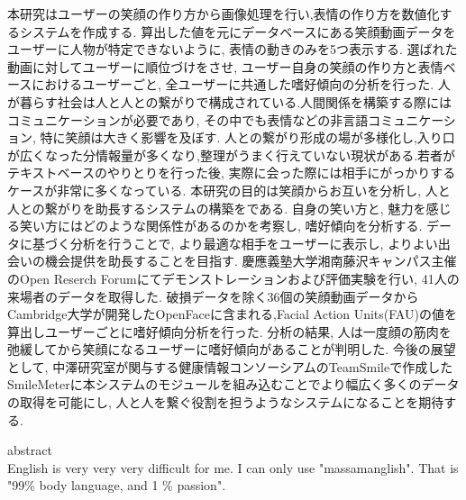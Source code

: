 


\begin{jabstract}
本研究はユーザーの笑顔の作り方から画像処理を行い,表情の作り方を数値化するシステムを作成する.
算出した値を元にデータベースにある笑顔動画データをユーザーに人物が特定できないように, 表情の動きのみを5つ表示する.
選ばれた動画に対してユーザーに順位づけをさせ, ユーザー自身の笑顔の作り方と表情ベースにおけるユーザーごと,
全ユーザーに共通した嗜好傾向の分析を行った.
人が暮らす社会は人と人との繋がりで構成されている.人間関係を構築する際には
コミュニケーションが必要であり, その中でも表情などの非言語コミュニケーション,
特に笑顔は大きく影響を及ぼす.
人との繋がり形成の場が多様化し,入り口が広くなった分情報量が多くなり,整理がうまく行えていない現状がある.若者がテキストベースのやりとりを行った後, 実際に会った際には相手にがっかりするケースが非常に多くなっている.
本研究の目的は笑顔からお互いを分析し, 人と人との繋がりを助長するシステムの構築をである.
自身の笑い方と, 魅力を感じる笑い方にはどのような関係性があるのかを考察し, 嗜好傾向を分析する.
データに基づく分析を行うことで, より最適な相手をユーザーに表示し, よりよい出会いの機会提供を助長することを目指す.
慶應義塾大学湘南藤沢キャンパス主催のOpen Reserch Forumにてデモンストレーションおよび評価実験を行い, 41人の来場者のデータを取得した. 破損データを除く36個の笑顔動画データからCambridge大学が開発したOpenFaceに含まれる,Facial Action Units(FAU)の値を算出しユーザーごとに嗜好傾向分析を行った.
分析の結果, 人は一度顔の筋肉を弛緩してから笑顔になるユーザーに嗜好傾向があることが判明した.
今後の展望として, 中澤研究室が関与する健康情報コンソーシアムのTeamSmileで作成したSmileMeterに本システムのモジュールを組み込むことでより幅広く多くのデータの取得を可能にし,
人と人を繋ぐ役割を担うようなシステムになることを期待する.
\end{jabstract}



\begin{eabstract}

abstract\\
English is very very very difficult for me.
I can only use "massamanglish".
That is "99\% body language, and 1 \% passion".

\end{eabstract}
